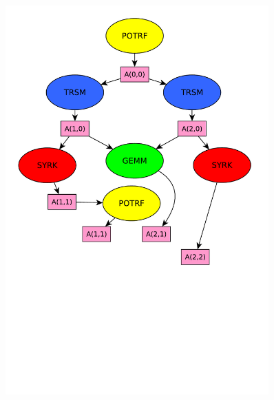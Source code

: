 \documentclass[xcolor={usenames,dvipsnames,svgnames,table}, aspectratio=43]{beamer}
\begin{document}
\begin{frame}[fragile]
\begin{minipage}[t]{0.46\linewidth}
\begin{figure}
{    \includegraphics[width=0.9\textwidth]{graph/anim-dag/anim-5.pdf}%
  }%
\end{figure}
\end{minipage}
\end{frame}
\end{document}
